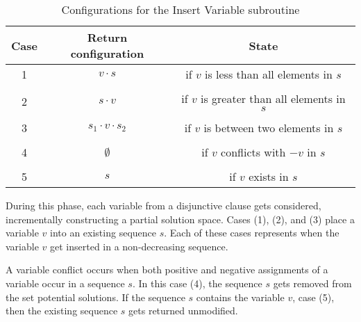 \begin{table}[htdp]
\caption{Configurations for the {\sc Insert Variable} subroutine}
\begin{center}
\begin{tabular}{|c|c|c|}
\hline
\textbf{Case} & \textbf{Return configuration} & \textbf{State} \\ \hline 
1	& $v \cdot s$ & if $v$ is less than all elements in $s$ \\ 
& &  \\ \hline
2	& $s \cdot v$ & if $v$ is greater than all elements in $s$ \\ 
& &  \\ \hline
3	& $s_1 \cdot v \cdot s_2$ & if $v$ is between two elements in $s$ \\ 
& &  \\ \hline
4	& $\emptyset$ & if $v$ conflicts with $-v$ in $s$\\
& &  \\ \hline
5	& $s$ & if $v$ exists in $s$\\ \hline
\end{tabular}
\end{center}
\label{distributionInsertTable}
\end{table}%

\FloatBarrier

		
During this phase, each variable from a disjunctive clause gets considered, incrementally constructing a partial solution space.  Cases (1), (2), and (3) place a variable $v$ into an existing sequence $s$.  Each of these cases represents when the variable $v$ get inserted in a non-decreasing sequence.




A variable conflict occurs when both positive and negative assignments of a variable occur in a sequence $s$.  In this case (4), the sequence $s$ gets removed from the set potential solutions.  If the sequence $s$ contains the variable $v$, case (5), then the existing sequence $s$ gets returned unmodified.




